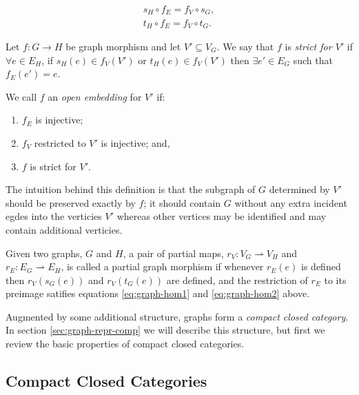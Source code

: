 \documentclass[runningheads]{llncs}
\begin{document}
\begin{gather}
  s_H\circ f_E = f_V \circ s_G,\label{eq:graph-hom1}\\
  t_H\circ f_E = f_V \circ t_G\label{eq:graph-hom2}.
\end{gather}

Let $f: G \to H$ be graph morphism and  let $V' \subseteq V_G$. We say
that $f$ is \emph{strict for $V'$} if $\forall e \in E_H$, if $s_H(e)
\in f_V(V')$ or $t_H(e) \in f_V(V')$ then $\exists e' \in E_G$ such
that $f_E(e') = e$. 

\begin{definition}
\label{open-embedding-def}
We call $f$ an \emph{open embedding} for $V'$ if:
\begin{enumerate}
\item $f_E$ is injective;
\item $f_V$ restricted to $V'$ is injective; and,
\item $f$ is strict for $V'$.
\end{enumerate}
\end{definition}

\noindent The intuition behind this definition is that the subgraph of
$G$ determined by $V'$ should be preserved exactly by $f$; it should
contain $G$ without any extra incident egdes into the verticies $V'$
whereas other vertices may be identified and may contain additional
verticies.

Given two graphs, $G$ and $H$, a pair of partial maps, $r_V: V_G
\rightharpoonup V_H$ and $r_E: E_G \rightharpoonup E_H$, is called a
partial graph morphism if whenever $r_E(e)$ is defined then
$r_V(s_G(e))$ and $r_V(t_G(e))$ are defined, and the restriction of
$r_E$ to its preimage satifies equations \eqref{eq:graph-hom1} and
\eqref{eq:graph-hom2} above.

Augmented by some additional structure, graphs form a \emph{compact closed
category}.  In section \ref{sec:graph-repr-comp} we will describe this
structure, but first we review the basic properties of compact closed
categories.

\subsection{Compact Closed Categories}
\label{sec:comp-clos-categ}
\end{document}

